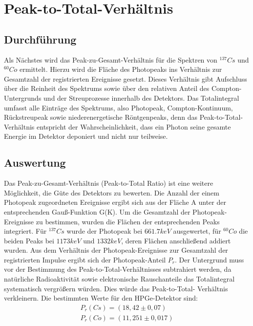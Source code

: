\chapter{Peak-to-Total-Verhältnis}
\section{Durchführung}
 Als Nächstes wird das Peak-zu-Gesamt-Verhältnis für die Spektren von $^{137}Cs$ und $^{60}Co$ ermittelt. Hierzu wird die Fläche des Photopeaks ins Verhältnis zur Gesamtzahl der registrierten Ereignisse gesetzt. Dieses Verhältnis gibt Aufschluss über die Reinheit des Spektrums sowie über den relativen Anteil des Compton-Untergrunds und der Streuprozesse innerhalb des Detektors. %
Das Totalintegral umfasst alle Einträge des Spektrums, also Photopeak, Compton-Kontinuum,
Rückstreupeak sowie niederenergetische Röntgenpeaks, denn das Peak-to-Total-Verhältnis entspricht der Wahrscheinlichkeit, dass ein Photon seine gesamte Energie im Detektor deponiert und nicht nur teilweise.

 \section{Auswertung }
 Das Peak-zu-Gesamt-Verhältnis (Peak-to-Total Ratio) ist eine weitere Möglichkeit, die Güte des Detektors zu bewerten. Die Anzahl der einem Photopeak zugeordneten Ereignisse ergibt sich aus der Fläche A unter der entsprechenden Gauß-Funktion G(K). Um die Gesamtzahl der Photopeak-Ereignisse zu bestimmen, wurden die Flächen der entsprechenden Peaks integriert. Für $^{137}Cs$ wurde der Photopeak bei $661.7keV$ ausgewertet, für $^{60}Co$ die beiden Peaks bei $1173keV$ und $1332keV$, deren Flächen anschließend addiert wurden. Aus dem Verhältnis der Photopeak-Ereignisse zur Gesamtzahl der registrierten Impulse ergibt sich der Photopeak-Anteil $P_r$. Der Untergrund muss vor der Bestimmung des Peak-to-Total-Verhältnisses subtrahiert werden, da natürliche Radioaktivität sowie elektronische Rauschanteile das Totalintegral systematisch vergrößern würden. Dies würde das Peak-to-Total-
Verhältnis verkleinern.
\cite{praktikum}
 Die bestimmten Werte für den HPGe-Detektor sind:
 \begin{align*}
    P_r(Cs) = (18,42 \pm 0,07)\\
    P_r(Co) = (11,251 \pm 0,017)
 \end{align*}

